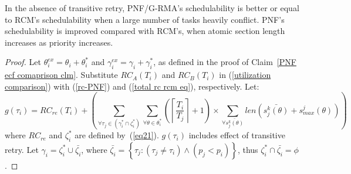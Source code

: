 \begin{clm}\label{clm_pnf_rcm_comp}
In the absence of transitive retry, PNF/G-RMA's schedulability is better or equal to RCM's schedulability when a large number of tasks heavily conflict. PNF's schedulability is improved compared with RCM's, when atomic section length increases as priority increases. 
\end{clm}
\begin{proof}\normalfont
Let $\theta_{i}^{ex}=\theta_{i}+\theta_{i}^{*}$ and $\gamma_{i}^{ex}=\gamma_{i}+\gamma_{i}^{*}$, as defined in the proof of Claim~\ref{PNF ecf comaprison clm}. Substitute $RC_{A}(T_{i})$ and $RC_{B}(T_{i})$ in (\ref{utilization comparison}) with (\ref{rc-PNF}) and (\ref{total rc rcm eq}), respectively. Let: 
%
\begin{equation*}
g(\tau_{i}) =RC_{re}(T_{i})+\left(\sum_{\forall\tau_{j}\in(\gamma_{i}^{*}\cap\zeta_{i}^{*})}\sum_{\forall\theta\in\theta_{i}^{*}}\left(\left\lceil \frac{T_{i}}{T_{j}}\right\rceil +1\right)\times \sum_{\forall\bar{s_{j}^{k}(\theta)}}len\left(\bar{s_{j}^{k}(\theta)}+s_{max}^{j}(\theta)\right)\right)
\end{equation*}
%
where $RC_{re}$ and $\zeta_i^*$ are defined by~(\ref{eq21}). $g(\tau_i)$ includes effect of transitive retry. 
Let $\gamma_{i}=\zeta_{i}^{*}\cup\bar{\zeta_{i}}$, where $\bar{\zeta_{i}}=\left\{ \tau_{j}:\left(\tau_{j}\ne\tau_{i}\right)\wedge\left(p_{j}<p_{i}\right)\right\} $,
thus $\zeta_{i}^{*}\cap\bar{\zeta_{i}}=\phi$.


\end{proof}
